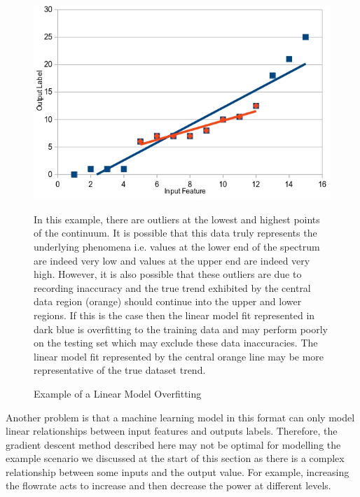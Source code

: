 \begin{figure}[h]
	\centering
	\includegraphics[scale=0.45]{Figures/overfitting.jpg}
	\caption{Example of a Linear Model Overfitting} {In this example, there are outliers at the lowest and highest points of the continuum.  It is possible that this data truly represents the underlying phenomena i.e. values at the lower end of the spectrum are indeed very low and values at the upper end are indeed very high. However, it is also possible that these outliers are due to recording inaccuracy and the true trend exhibited by the central data region (orange) should continue into the upper and lower regions. If this is the case then the linear model fit represented in dark blue is overfitting to the training data and may perform poorly on the testing set which may exclude these data inaccuracies. The linear model fit represented by the central orange line may be more representative of the true dataset trend.}
	\label{fig:overfitting}
\end{figure}
		
\noindent
Another problem is that a machine learning model in this format can only model linear relationships between input features and outputs labels. Therefore, the gradient descent method described here may not be optimal for modelling the example scenario we discussed at the start of this section as there is a complex relationship between some inputs and the output value. For example, increasing the flowrate acts to increase and then decrease the power at different levels. \\		


